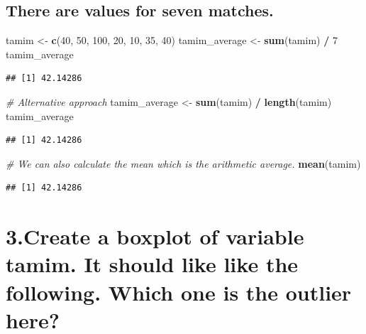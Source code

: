 \documentclass[]{article}
\newenvironment{Shaded}{\begin{snugshade}}{\end{snugshade}}
\newcommand{\CommentTok}[1]{\textcolor[rgb]{0.56,0.35,0.01}{\textit{#1}}}
\newcommand{\DecValTok}[1]{\textcolor[rgb]{0.00,0.00,0.81}{#1}}
\newcommand{\KeywordTok}[1]{\textcolor[rgb]{0.13,0.29,0.53}{\textbf{#1}}}
\newcommand{\NormalTok}[1]{#1}
\newcommand{\OperatorTok}[1]{\textcolor[rgb]{0.81,0.36,0.00}{\textbf{#1}}}
\newcommand{\StringTok}[1]{\textcolor[rgb]{0.31,0.60,0.02}{#1}}
\begin{document}
\hypertarget{there-are-values-for-seven-matches.}{%
\subsection{There are values for seven
matches.}\label{there-are-values-for-seven-matches.}}

\begin{Shaded}
\begin{Highlighting}[]
\NormalTok{tamim <-}\StringTok{ }\KeywordTok{c}\NormalTok{(}\DecValTok{40}\NormalTok{, }\DecValTok{50}\NormalTok{, }\DecValTok{100}\NormalTok{, }\DecValTok{20}\NormalTok{, }\DecValTok{10}\NormalTok{, }\DecValTok{35}\NormalTok{, }\DecValTok{40}\NormalTok{)}
\NormalTok{tamim_average <-}\StringTok{ }\KeywordTok{sum}\NormalTok{(tamim) }\OperatorTok{/}\StringTok{ }\DecValTok{7}
\NormalTok{tamim_average}
\end{Highlighting}
\end{Shaded}

\begin{verbatim}
## [1] 42.14286
\end{verbatim}

\begin{Shaded}
\begin{Highlighting}[]
\CommentTok{# Alternative approach}
\NormalTok{tamim_average <-}\StringTok{ }\KeywordTok{sum}\NormalTok{(tamim) }\OperatorTok{/}\StringTok{ }\KeywordTok{length}\NormalTok{(tamim)}
\NormalTok{tamim_average}
\end{Highlighting}
\end{Shaded}

\begin{verbatim}
## [1] 42.14286
\end{verbatim}

\begin{Shaded}
\begin{Highlighting}[]
\CommentTok{# We can also calculate the mean which is the arithmetic average.}
\KeywordTok{mean}\NormalTok{(tamim)}
\end{Highlighting}
\end{Shaded}

\begin{verbatim}
## [1] 42.14286
\end{verbatim}

\hypertarget{create-a-boxplot-of-variable-tamim.-it-should-like-like-the-following.-which-one-is-the-outlier-here}{%
\section{3.Create a boxplot of variable tamim. It should like like the
following. Which one is the outlier
here?}\label{create-a-boxplot-of-variable-tamim.-it-should-like-like-the-following.-which-one-is-the-outlier-here}}
\end{document}
